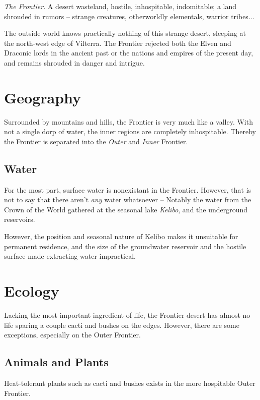 \documentclass[../main.tex]{subfiles}
\begin{document}
\emph{The Frontier}. A desert wasteland, hostile, inhospitable, indomitable;
a land shrouded in rumors -- strange creatures, otherworldly elementals,
warrior tribes...

The outside world knows practically nothing of this strange desert,
sleeping at the north-west edge of Vilterra. The Frontier rejected both the Elven
and Draconic lords in the ancient past or the nations and empires of the present
day, and remains shrouded in danger and intrigue.

\section{Geography}
Surrounded by mountains and hills, the Frontier is very much like a valley.
With not a single dorp of water, the inner regions are completely inhospitable.
Thereby the Frontier is separated into the \emph{Outer} and \emph{Inner}
Frontier.

\subsection{Water}
For the most part, surface water is nonexistant in the Frontier. However,
that is not to say that there aren't \emph{any} water whatsoever -- Notably
the water from the Crown of the World gathered at the seasonal lake \emph{Kelibo},
and the underground reservoirs.

However, the position and seasonal nature of
Kelibo makes it unsuitable for permanent residence, and the size of the
groundwater reservoir and the hostile surface made extracting water impractical.

\section{Ecology}
Lacking the most important ingredient of life, the Frontier desert has
almost no life sparing a couple cacti and bushes on the edges. However,
there are some exceptions, especially on the Outer Frontier.

\subsection{Animals and Plants}
Heat-tolerant plants such as cacti and bushes exists in the more
hospitable Outer Frontier.
\end{document}

